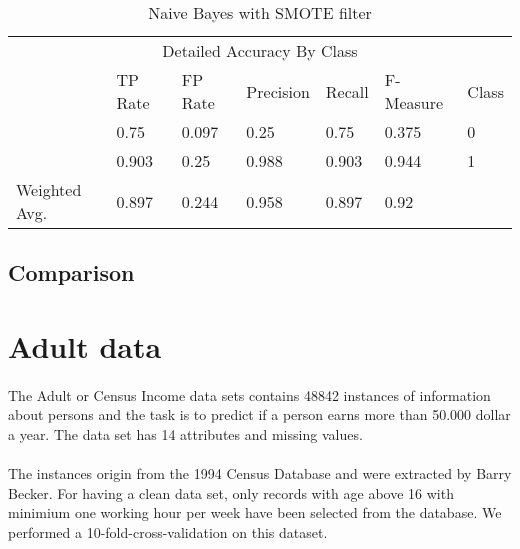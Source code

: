 \documentclass[paper=a4, fontsize=11pt]{scrartcl} %
\numberwithin{equation}{section} %
\numberwithin{figure}{section} %
\numberwithin{table}{section} %
\begin{document}
\begin{table*}[htb]\centering
  \begin{tabular*}{\columnwidth}{@{}lllllll@{}}
      \toprule 
      \multicolumn{7}{c}{Detailed Accuracy By Class} \\ 
              &  TP Rate & FP Rate & Precision & Recall & F-Measure & Class    \\  \midrule
              &   0.75   & 0.097   & 0.25      & 0.75   & 0.375     & 0 \\
              &   0.903  & 0.25    & 0.988     & 0.903  & 0.944     & 1 \\
Weighted Avg. &   0.897  & 0.244   & 0.958     & 0.897  & 0.92      &   \\ \bottomrule
  \end{tabular*}
\caption{Naive Bayes with SMOTE filter} 
\label{tab:echo:bayes:2d}
\end{table*}


\subsection{Comparison}






\section{Adult data}

\paragraph{}The Adult or Census Income data sets contains 48842 instances of information about persons and the task is to predict if a person earns more than 50.000 dollar a year. The data set has 14 attributes and missing values.

\paragraph{}The instances origin from the 1994 Census Database and were extracted by Barry Becker. For having a clean data set, only records with age above 16 with minimium one working hour per week have been selected from the database. We performed a 10-fold-cross-validation on this dataset.
\end{document}
